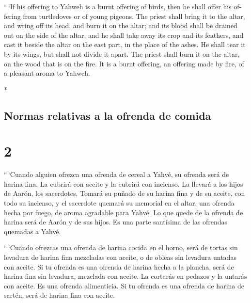 \begin{paracol}{2}
\begin{otherlanguage}{english}
 ``\,`If his offering to Yahweh is a burnt offering of
birds, then he shall offer his offering from turtledoves or of young
pigeons.  The priest shall bring it to the altar, and
wring off its head, and burn it on the altar; and its blood shall be
drained out on the side of the altar;  and he shall take
away its crop and its feathers, and cast it beside the altar on the east
part, in the place of the ashes.  He shall tear it by its
wings, but shall not divide it apart. The priest shall burn it on the
altar, on the wood that is on the fire. It is a burnt offering, an
offering made by fire, of a pleasant aroma to Yahweh.

\end{otherlanguage}

\switchcolumn[0]*

\hypertarget{normas-relativas-a-la-ofrenda-de-comida}{%
\subsection{Normas relativas a la ofrenda de
comida}\label{normas-relativas-a-la-ofrenda-de-comida}}

\hypertarget{section-2}{%
\section{2}\label{section-2}}

 ``\,`Cuando alguien ofrezca una ofrenda de cereal a
Yahvé, su ofrenda será de harina fina. La cubrirá con aceite y la
cubrirá con incienso.  La llevará a los hijos de Aarón,
los sacerdotes. Tomará su puñado de su harina fina y de su aceite, con
todo su incienso, y el sacerdote quemará su memorial en el altar, una
ofrenda hecha por fuego, de aroma agradable para Yahvé. 
Lo que quede de la ofrenda de harina será de Aarón y de sus hijos. Es
una parte santísima de las ofrendas quemadas a Yahvé.

 ``\,`Cuando ofrezcas una ofrenda de harina cocida en el
horno, será de tortas sin levadura de harina fina mezcladas con aceite,
o de obleas sin levadura untadas con aceite.  Si tu
ofrenda es una ofrenda de harina hecha a la plancha, será de harina fina
sin levadura, mezclada con aceite.  La cortarás en pedazos
y la untarás con aceite. Es una ofrenda alimenticia.  Si
tu ofrenda es una ofrenda de harina de sartén, será de harina fina con
aceite.


\end{paracol}
